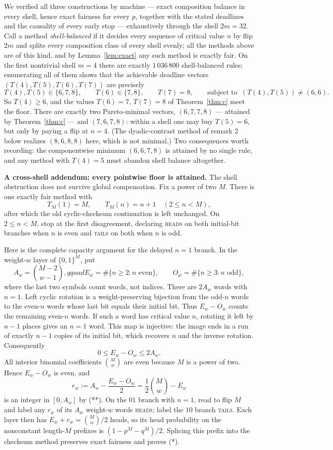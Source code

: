 \documentclass[11pt]{article}
\theoremstyle{remark}
\newcommand{\head}{\textnormal{\textsc{heads}}}
\newcommand{\tail}{\textnormal{\textsc{tails}}}
\begin{document}
We verified all three constructions by machine --- exact composition balance
in every shell, hence exact fairness for every $p$, together with the stated
deadlines and the causality of every early stop --- exhaustively through the
shell $2m=32$. Call a method \emph{shell-balanced} if it decides every
sequence of critical value $n$ by flip $2m$ and splits every composition
class of every shell evenly; all the methods above are of this kind, and by
Lemma~\ref{lem:exact} any such method is exactly fair. On the first
nontrivial shell $m=4$ there are exactly $1\,036\,800$ shell-balanced rules;
enumerating all of them shows that the achievable deadline vectors
$(T(4),T(5),T(6),T(7))$ are precisely
\[
T(4),T(5)\in\{6,7,8\},\qquad T(6)\in\{7,8\},\qquad T(7)=8,
\qquad\text{subject to } \ (T(4),T(5))\ne(6,6).
\]
So $T(4)\ge6$, and the values $T(6)=7$, $T(7)=8$ of Theorem~\ref{thm:c} meet
the floor. There are exactly two Pareto-minimal vectors, $(6,7,7,8)$ ---
attained by Theorem~\ref{thm:c} --- and $(7,6,7,8)$: within a shell one may
buy $T(5)=6$, but only by paying a flip at $n=4$. (The dyadic-contrast method
of remark 2 below realizes $(8,6,8,8)$ here, which is not minimal.) Two
consequences worth recording: the componentwise minimum $(6,6,7,8)$ is
attained by no single rule, and any method with $T(4)=5$ must abandon shell
balance altogether.

\medskip
\noindent\textbf{A cross-shell addendum: every pointwise floor is attained.}
The shell obstruction does not survive global compensation.  Fix a power of
two $M$.  There is one exactly fair method with
\[
 T_M(1)=M,\qquad T_M(n)=n+1\quad(2\le n<M),                 \tag{*}
\]
after which the old cyclic-checksum continuation is left unchanged.  On
$2\le n<M$, stop at the first disagreement, declaring \head{} on both
initial-bit branches when $n$ is even and \tail{} on both when $n$ is odd.

Here is the complete capacity argument for the delayed $n=1$ branch.  In the
weight-$w$ layer of $\{0,1\}^M$, put
\[
 A_w=\binom{M-2}{w-1},qquad
 E_w=\#\{n\ge2:n\text{ even}\},\qquad
 O_w=\#\{n\ge3:n\text{ odd}\},
\]
where the last two symbols count words, not indices.  There are $2A_w$ words
with $n=1$.  Left cyclic rotation is a weight-preserving bijection from the
odd-$n$ words to the even-$n$ words whose last bit equals their initial bit.
Thus $E_w-O_w$ counts the remaining even-$n$ words.  If such a word has
critical value $n$, rotating it left by $n-1$ places gives an $n=1$ word.
This map is injective: the image ends in a run of exactly $n-1$ copies of its
initial bit, which recovers $n$ and the inverse rotation.  Consequently
\[
 0\le E_w-O_w\le2A_w.                                      \tag{**}
\]
All interior binomial coefficients $\binom Mw$ are even because $M$ is a
power of two.  Hence $E_w-O_w$ is even, and
\[
 r_w:=A_w-\frac{E_w-O_w}{2}
     =\frac12\binom Mw-E_w
\]
is an integer in $[0,A_w]$ by (**).  On the $01$ branch with $n=1$, read to
flip $M$ and label any $r_w$ of its $A_w$ weight-$w$ words \head{}; label the
$10$ branch \tail{}.  Each layer then has $E_w+r_w=\binom Mw/2$ heads, so its
head probability on the nonconstant length-$M$ prefixes is
$(1-p^M-q^M)/2$.  Splicing this prefix into the checksum method preserves
exact fairness and proves (*).
\end{document}
